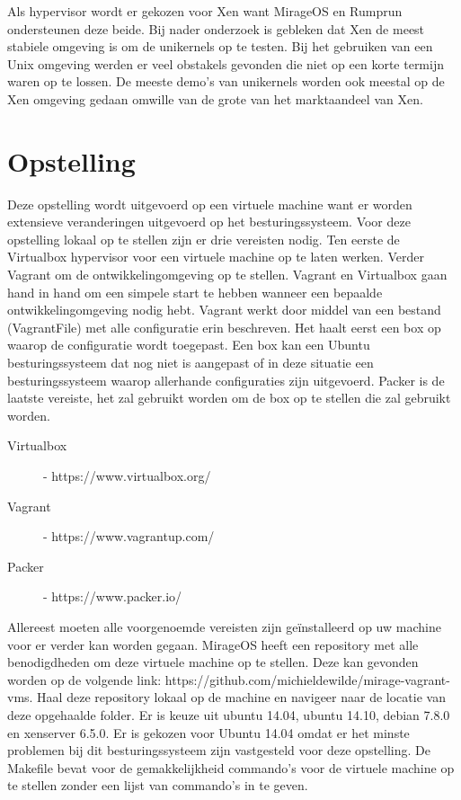 \documentclass[pdftex,a4paper,12pt,twoside]{report}
\begin{document}
Als hypervisor wordt er gekozen voor Xen want MirageOS en Rumprun ondersteunen deze beide. Bij nader onderzoek is gebleken dat Xen de meest stabiele omgeving is om de unikernels op te testen. Bij het gebruiken van een Unix omgeving werden er veel obstakels gevonden die niet op een korte termijn waren op te lossen. De meeste demo's van unikernels worden ook meestal op de Xen omgeving gedaan omwille van de grote van het marktaandeel van Xen.

\section{Opstelling}

Deze opstelling wordt uitgevoerd op een virtuele machine want er worden extensieve veranderingen uitgevoerd op het besturingssysteem. Voor deze opstelling lokaal op te stellen zijn er drie vereisten nodig. Ten eerste de Virtualbox hypervisor voor een virtuele machine op te laten werken. Verder Vagrant om de ontwikkelingomgeving op te stellen. Vagrant en Virtualbox gaan hand in hand om een simpele start te hebben wanneer een bepaalde ontwikkelingomgeving nodig hebt. Vagrant werkt door middel van een bestand (VagrantFile) met alle configuratie erin beschreven. Het haalt eerst een box op waarop de configuratie wordt toegepast. Een box kan een Ubuntu besturingssysteem dat nog niet is aangepast of in deze situatie een besturingssysteem waarop allerhande configuraties zijn uitgevoerd. Packer is de laatste vereiste, het zal gebruikt worden om de box op te stellen die zal gebruikt worden. 

\begin{description}
\item [Virtualbox] - https://www.virtualbox.org/
\item [Vagrant] - https://www.vagrantup.com/
\item [Packer] - https://www.packer.io/ 
\end{description}

Allereest moeten alle voorgenoemde vereisten zijn geïnstalleerd op uw machine voor er verder kan worden gegaan. MirageOS heeft een repository met alle benodigdheden om deze virtuele machine op te stellen. Deze kan gevonden worden op de volgende link: https://github.com/michieldewilde/mirage-vagrant-vms. Haal deze repository lokaal op de machine en navigeer naar de locatie van deze opgehaalde folder. Er is keuze uit ubuntu 14.04, ubuntu 14.10, debian 7.8.0 en xenserver 6.5.0. Er is gekozen voor Ubuntu 14.04 omdat er het minste problemen bij dit besturingssysteem zijn vastgesteld voor deze opstelling. De Makefile bevat voor de gemakkelijkheid commando's voor de virtuele machine op te stellen zonder een lijst van commando's in te geven.
\end{document}

